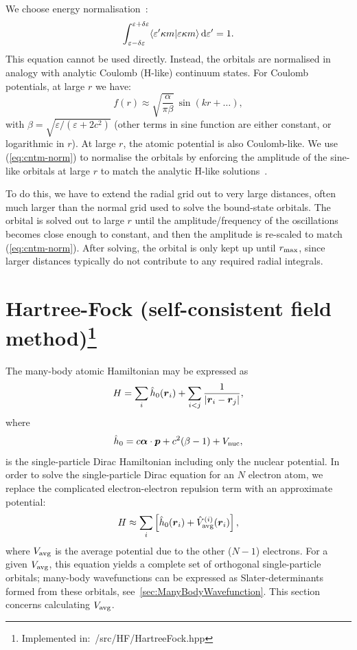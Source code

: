 \documentclass[10pt,twocolumn,a4paper]{article}%
\newcommand{\braket}[1]{\ensuremath{\langle #1\rangle}}	%
\renewcommand{\v}[1]{\ensuremath{\boldsymbol{#1}}}		%
\newcommand{\be}{\begin{equation}}
\newcommand{\ee}{\end{equation}}
\def\d{\ensuremath{{\rm d}}}
\def\en{\ensuremath{\varepsilon}}
\renewcommand{\k}{\ensuremath{\kappa}}
\begin{document}
We choose energy normalisation~\cite{BetheBook}:
\be
\int_{\en-\delta\en}^{\en+\delta\en}\braket{\en' \k m|\en \k m}\,\d\en' = 1.
\ee
This equation cannot be used directly.
Instead, the orbitals are normalised in analogy with analytic Coulomb (H-like) continuum states.
For Coulomb potentials, at large $r$ we have:
\be\label{eq:cntm-norm}
f(r) \approx \sqrt{\frac{\alpha}{\pi \beta}}\,\sin(kr + \ldots),
\ee
with
$
\beta = \sqrt{{\en}/({\en + 2c^2})}
$
(other terms in sine function are either constant, or logarithmic in $r$).
At large $r$, the atomic potential is also Coulomb-like.
We use (\ref{eq:cntm-norm}) to normalise the orbitals by enforcing the amplitude of the sine-like orbitals at large $r$ to match the analytic H-like solutions~\cite{BetheBook}.

To do this, we have to extend the radial grid out to very large distances, often much larger than the normal grid used to solve the bound-state orbitals.
The orbital is solved out to large $r$ until the amplitude/frequency of the oscillations becomes close enough to constant, and then the amplitude is re-scaled to match (\ref{eq:cntm-norm}).
After solving, the orbital is only kept up until $r_{\rm max}$, since larger distances typically do not contribute to any required radial integrals. 



\section[Hartree-Fock (self-consistent field method)]{Hartree-Fock (self-consistent field method)\footnote{Implemented in:~/src/HF/HartreeFock.hpp}}


The many-body atomic Hamiltonian may be expressed as
\be\label{eq:H-manybody}
H = \sum_i \hat h_{\rm 0}(\v{r}_i) + \sum_{i<j}\frac{1}{|\v{r}_i-\v{r}_j|},
\ee
where 
\[\hat h_0 = c \v{\alpha}\cdot\v{p} + c^2(\beta-1) +  V_{\rm nuc},\]
is the single-particle Dirac Hamiltonian including only the nuclear potential.
In order to solve the single-particle Dirac equation for an $N$ electron atom, we replace the complicated electron-electron repulsion term with an approximate potential:
\be
H \approx \sum_i \left[ \hat h_{\rm 0}(\v{r}_i) + \hat V_{\rm avg}^{(i)}(\v{r}_i) \right],
\ee
where $V_{\rm avg}$ is the average potential due to the other ($N-1$) electrons.
For a given $V_{\rm avg}$, this equation yields a complete set of orthogonal single-particle orbitals; many-body wavefunctions can be expressed as Slater-determinants formed from these orbitals, see~\ref{sec:ManyBodyWavefunction}.
This section concerns calculating $V_{\rm avg}$.
\end{document}
